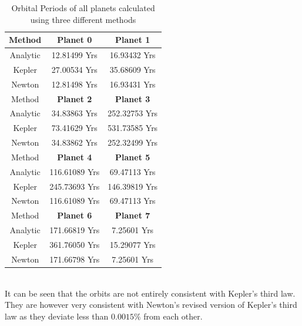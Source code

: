 \documentclass[reprint,english,notitlepage]{revtex4-2}
\begin{document}
\begin{table}[h]
    \begin{tabular}{ |c|c|c| }
        \hline
		Method & \textbf{Planet 0} & \textbf{Planet 1}\\
		\hline
        Analytic	& 12.81499 Yrs & 16.93432 Yrs\\
		Kepler		& 27.00534 Yrs & 35.68609 Yrs\\
		Newton		& 12.81498 Yrs & 16.93431 Yrs\\
		\hline\hline
		Method & \textbf{Planet 2} & \textbf{Planet 3}\\
		\hline
        Analytic	& 34.83863 Yrs & 252.32753 Yrs\\
		Kepler		& 73.41629 Yrs & 531.73585 Yrs\\
		Newton		& 34.83862 Yrs & 252.32499 Yrs\\
		\hline\hline
		Method & \textbf{Planet 4} & \textbf{Planet 5}\\
		\hline
        Analytic	& 116.61089 Yrs & 69.47113 Yrs\\
		Kepler		& 245.73693 Yrs & 146.39819 Yrs\\
		Newton		& 116.61089 Yrs & 69.47113 Yrs\\
		\hline\hline
		Method & \textbf{Planet 6} & \textbf{Planet 7}\\
		\hline
        Analytic	& 171.66819 Yrs & 7.25601 Yrs\\
		Kepler		& 361.76050 Yrs & 15.29077 Yrs\\
		Newton		& 171.66798 Yrs & 7.25601 Yrs\\
		\hline
	\end{tabular}
    \caption{Orbital Periods of all planets calculated using three different methods}
    \label{tab:Kepler3_Table}
\end{table}


\\It can be seen that the orbits are not entirely consistent with Kepler's third law.
They are however very consistent with Newton's revised version of Kepler's third law as they deviate less than $0.0015\%$ from each other.
\end{document}
